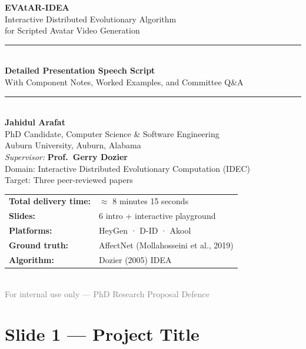 \documentclass[12pt,a4paper]{article}
\begin{document}
\begin{titlepage}\centering
\vspace*{1.5cm}
{\huge\bfseries\color{navy}EVAtAR-IDEA}\\[0.5cm]
{\Large\color{auburn}Interactive Distributed Evolutionary Algorithm\\
for Scripted Avatar Video Generation}\\[1cm]
\rule{0.65\linewidth}{0.6pt}\\[0.8cm]
{\LARGE\bfseries Detailed Presentation Speech Script}\\[0.4cm]
{\large With Component Notes, Worked Examples, and Committee Q\&A}\\[1cm]
\rule{0.65\linewidth}{0.4pt}\\[0.8cm]
{\large\textbf{Jahidul Arafat}}\\[0.2cm]
{\normalsize PhD Candidate, Computer Science \& Software Engineering}\\
{\normalsize Auburn University, Auburn, Alabama}\\[0.5cm]
{\normalsize\textit{Supervisor:} \textbf{Prof.\ Gerry Dozier}}\\[0.3cm]
{\normalsize Domain: Interactive Distributed Evolutionary Computation (IDEC)}\\
{\normalsize Target: Three peer-reviewed papers}\\[1.2cm]
\begin{tabular}{ll}
\textbf{Total delivery time:} & $\approx$ 8 minutes 15 seconds \\
\textbf{Slides:} & 6 intro + interactive playground \\
\textbf{Platforms:} & HeyGen · D-ID · Akool \\
\textbf{Ground truth:} & AffectNet (Mollahosseini et al., 2019) \\
\textbf{Algorithm:} & Dozier (2005) IDEA \\
\end{tabular}\\[1.5cm]
{\small\textcolor{gray}{For internal use only --- PhD Research Proposal Defence}}
\end{titlepage}

\tableofcontents\newpage

\section{Slide 1 --- Project Title}
\end{document}
